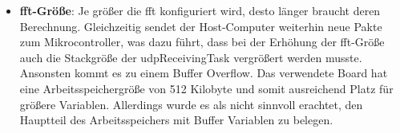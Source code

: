 \documentclass[../EDF Master Thesis.tex]{subfiles}
\begin{document}
\begin{itemize}
        \item \textbf{\ac{fft}-Größe}: Je größer die \ac{fft} konfiguriert wird, desto länger braucht deren Berechnung.
            Gleichzeitig sendet der Host-Computer weiterhin neue Pakte zum Mikrocontroller, was dazu führt, dass bei der Erhöhung der \ac{fft}-Größe auch die Stackgröße der udpReceivingTask vergrößert werden musste.
            Ansonsten kommt es zu einem Buffer Overflow.
            Das verwendete Board hat eine Arbeitsspeichergröße von 512 Kilobyte und somit ausreichend Platz für größere Variablen.
            Allerdings wurde es als nicht sinnvoll erachtet, den Hauptteil des Arbeitsspeichers mit Buffer Variablen zu belegen.
    \end{itemize}
\end{document}
